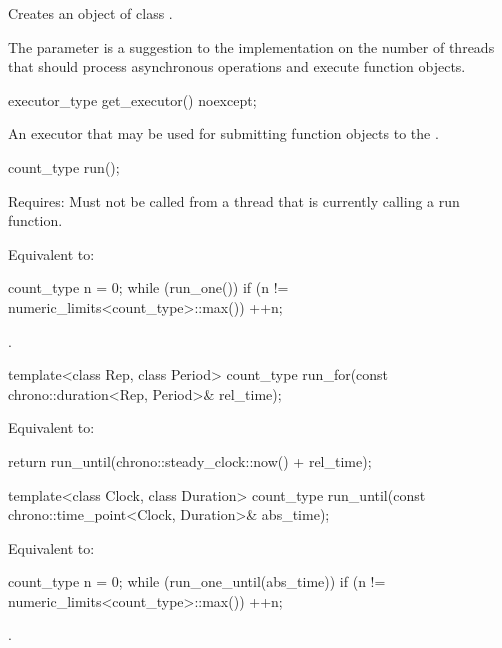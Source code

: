 \begin{itemdescr}
\pnum
\effects Creates an object of class .

\pnum
\remarks The  parameter is a suggestion to the implementation on the number of threads that should process asynchronous operations and execute function objects.
\end{itemdescr}

\begin{itemdecl}
executor_type get_executor() noexcept;
\end{itemdecl}

\begin{itemdescr}
\pnum
\returns An executor that may be used for submitting function objects to the .
\end{itemdescr}

\begin{itemdecl}
count_type run();
\end{itemdecl}

\begin{itemdescr}
\pnum
Requires: Must not be called from a thread that is currently calling a run function.

\pnum
\effects Equivalent to: 
\begin{codeblock}
count_type n = 0;
while (run_one())
  if (n != numeric_limits<count_type>::max())
    ++n;
\end{codeblock}


\pnum
\returns {}.
\end{itemdescr}

\begin{itemdecl}
template<class Rep, class Period>
  count_type run_for(const chrono::duration<Rep, Period>& rel_time);
\end{itemdecl}

\begin{itemdescr}
\pnum
\effects Equivalent to: 
\begin{codeblock}
return run_until(chrono::steady_clock::now() + rel_time);
\end{codeblock}

\end{itemdescr}

\begin{itemdecl}
template<class Clock, class Duration>
  count_type run_until(const chrono::time_point<Clock, Duration>& abs_time);
\end{itemdecl}

\begin{itemdescr}
\pnum
\effects Equivalent to: 
\begin{codeblock}
count_type n = 0;
while (run_one_until(abs_time))
  if (n != numeric_limits<count_type>::max())
    ++n;
\end{codeblock}


\pnum
\returns {}.
\end{itemdescr}

